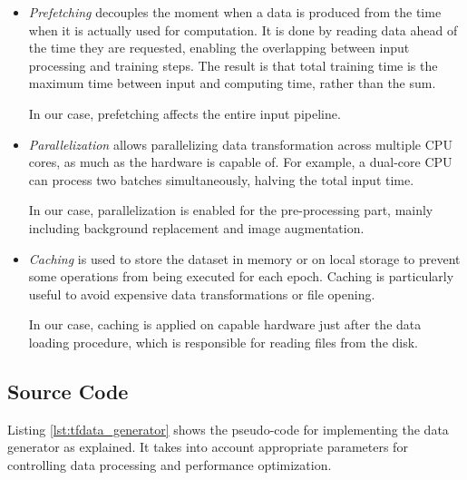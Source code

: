 \begin{itemize}
    \item \textit{Prefetching} decouples the moment when a data is produced from the time when it is actually used for computation. It is done by reading data ahead of the time they are requested, enabling the overlapping between input processing and training steps. The result is that total training time is the maximum time between input and computing time, rather than the sum.
    
    In our case, prefetching affects the entire input pipeline.
    
    \item \textit{Parallelization} allows parallelizing data transformation across multiple CPU cores, as much as the hardware is capable of. For example, a dual-core CPU can process two batches simultaneously, halving the total input time. 
    
    In our case, parallelization is enabled for the pre-processing part, mainly including background replacement and image augmentation.
    
    \item \textit{Caching} is used to store the dataset in memory or on local storage to prevent some operations from being executed for each epoch. Caching is particularly useful to avoid expensive data transformations or file opening.
    
    In our case, caching is applied on capable hardware just after the data loading procedure, which is responsible for reading files from the disk.
\end{itemize}



\subsection{Source Code}
\label{subsec:data-generator-code}

Listing \ref{lst:tfdata_generator} shows the pseudo-code for implementing the data generator as explained. It takes into account appropriate parameters for controlling data processing and performance optimization.

